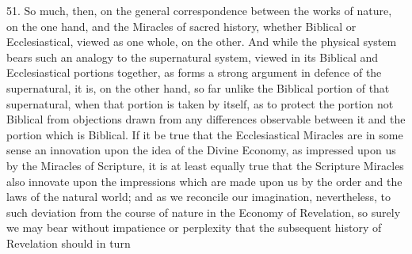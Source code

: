 51.
So much, then, on the general correspondence between the works of
nature, on the one hand, and the Miracles of sacred history, whether
Biblical or Ecclesiastical, viewed as one whole, on the other. And
while the physical system bears such an analogy to the supernatural
system, viewed in its Biblical and Ecclesiastical portions
together, as forms a strong argument in defence of the supernatural,
it is, on the other hand, so far unlike the Biblical portion of that
supernatural, when that portion is taken by itself, as to protect the
portion not Biblical from objections drawn from any differences
observable between it and the portion which is Biblical. If it be true
that the Ecclesiastical Miracles are in some sense an innovation upon
the idea of the Divine Economy, as impressed upon us by the Miracles
of Scripture, it is at least equally true that the Scripture Miracles
also innovate upon the impressions which are made upon us by the order
and the laws of the natural world; and as we reconcile our
imagination, nevertheless, to such deviation from the course of nature
in the Economy of Revelation, so surely we may bear without impatience
or perplexity that the subsequent history of Revelation should in turn
